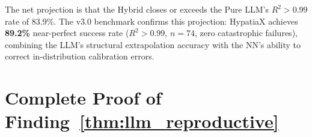 \documentclass[11pt,a4paper]{article}
\begin{document}
\bigskip
\noindent The net projection is that the Hybrid closes or exceeds the Pure
LLM's $R^2 > 0.99$ rate of $83.9\%$.  The v3.0 benchmark confirms this
projection: HypatiaX achieves \textbf{89.2\%} near-perfect success rate
($R^2>0.99$, $n=74$, zero catastrophic failures), combining the LLM's
structural extrapolation accuracy with the NN's ability to correct
in-distribution calibration errors.

\appendix

\section{Complete Proof of Finding~\ref{thm:llm_reproductive}}
\label{app:proof}
\end{document}
